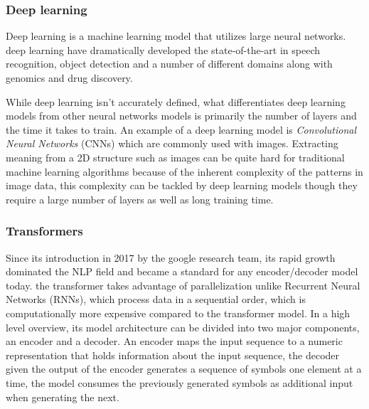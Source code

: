 \documentclass[12pt]{diazessay}
\begin{document}
        

        \subsubsection{Deep learning}
        Deep learning is a machine learning model that utilizes large neural networks. deep learning have dramatically developed the state-of-the-art in speech recognition, object detection and a number of different domains along with genomics and drug discovery\cite{Hinton}. %
        
        While deep learning isn't accurately defined, what differentiates deep learning models from other neural networks models is primarily the number of layers and the time it takes to train. An example of a deep learning model is \emph{Convolutional Neural Networks} (CNNs) which are commonly used with images. Extracting meaning from a 2D structure such as images can be quite hard for traditional machine learning algorithms because of the inherent complexity of the patterns in image data, this complexity can be tackled by deep learning models though they require a large number of layers as well as long training time.
        
         
        \subsubsection{Transformers} \label{txt:transformers_section}
        Since its introduction in 2017 by the google research team, its rapid growth dominated the NLP field and became a standard for any encoder/decoder model today\cite{wolf-etal-2020-transformers}. the transformer takes advantage of parallelization unlike Recurrent Neural Networks (RNNs), which process data in a sequential order, which is computationally more expensive compared to the transformer model\cite{46201}. In a high level overview, its model architecture can be divided into two major components, an encoder and a decoder. An encoder maps the input sequence to a numeric representation that holds information about the input sequence, the decoder given the output of the encoder generates a sequence of symbols one element at a time, the model consumes the previously generated symbols as additional input when generating the next\cite{46201}.
\end{document}
